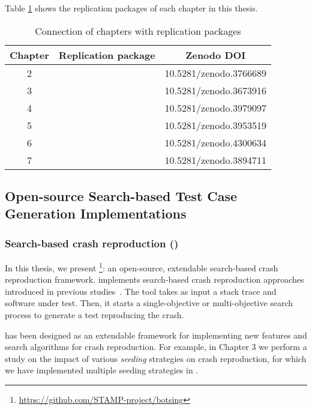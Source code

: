 Table \ref{tab:replicationpackages} shows the replication packages of each chapter in this thesis.

\begin{table}[!t]
    \begin{center}
        
    \footnotesize
    \caption{Connection of chapters with replication packages}
    \label{tab:replicationpackages}
    \begin{tabular}{|c||c|c|}
    \textbf{Chapter} & \textbf{Replication package} & \textbf{Zenodo DOI}\\
    \hline
    \hline
    2 & \cite{zenodoJCrashPack}& 10.5281/zenodo.3766689 \\
    3 & \cite{pouria_derakhshanfar_2019_3673916}& 10.5281/zenodo.3673916 \\
    4 & \cite{zenodoRP}& 10.5281/zenodo.3979097 \\
    5 & \cite{derakhshanfar_pouria_2020_3953519}& 10.5281/zenodo.3953519\\
    6 & \cite{pouria_derakhshanfar_2020_4300634}& 10.5281/zenodo.4300634 \\
    7 & \cite{evers_bjorn_2020_3894711}& 10.5281/zenodo.3894711\\
    \hline
    \end{tabular}
\end{center}
    \end{table}

\subsection{Open-source Search-based Test Case Generation Implementations}
\subsubsection{Search-based crash reproduction (\botsing)}
In this thesis, we present \botsing\footnote{\url{https://github.com/STAMP-project/botsing}}: an open-source, extendable search-based crash reproduction framework. \botsing implements search-based crash reproduction approaches introduced in previous studies~\cite{Rossler2013, Soltani2018a, Soltani2018b}. The tool takes as input a stack trace and software under test. Then, it starts a single-objective or multi-objective search process to generate a test reproducing the crash.

\botsing has been designed as an extendable framework for implementing new features and search algorithms for crash reproduction. For example, in Chapter 3 we perform a study on the impact of various \emph{seeding} strategies on crash reproduction, for which we have implemented multiple seeding strategies in \botsing.

